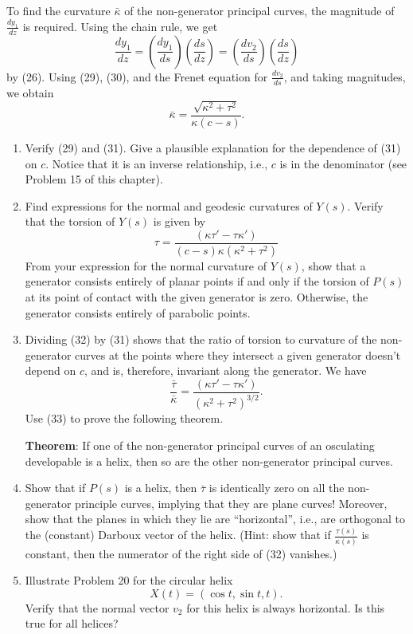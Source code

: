 \documentclass{book}
\begin{document}
To find the curvature $\bar{\kappa}$ of the non-generator principal curves, the magnitude of $\frac{dy_{1}}{dz}$ is required. Using the chain rule, we get
\begin{equation}
\frac{dy_{1}}{dz} = \left( \frac{dy_{1}}{ds} \right)  \left( \frac{ds}{dz} \right) = \left( \frac{dv_{2}}{ds} \right)  \left( \frac{ds}{dz} \right)
\end{equation}
by (26). Using (29), (30), and the Frenet equation for $\frac{dv_{2}}{ds}$, and taking magnitudes, we obtain
\begin{equation}
\bar{\kappa} = \frac{ \sqrt{\kappa ^{2} + \tau ^{2}} }{ \kappa (c - s) }.
\end{equation}

\begin{enumerate}
  \item[17.] Verify (29) and (31). Give a plausible explanation for the dependence of (31) on $c$. Notice that it is an inverse relationship, i.e., $c$ is in the denominator (see Problem 15 of this chapter).
  \item[18.] Find expressions for the normal and geodesic curvatures of $Y(s)$. Verify that the torsion of $Y(s)$ is given by
    \begin{equation}
      \tau = \frac{ (\kappa \tau ' - \tau \kappa ') }{ (c - s) \kappa (\kappa ^{2} + \tau ^{2}) }
    \end{equation}
    From your expression for the normal curvature of $Y(s)$, show that a generator consists entirely of planar points if and only if the torsion of $P(s)$ at its point of contact with the given generator is zero. Otherwise, the generator consists entirely of parabolic points.
  \item[19.] Dividing (32) by (31) shows that the ratio of torsion to curvature of the non-generator curves at the points where they intersect a given generator doesn't depend on $c$, and is, therefore, invariant along the generator. We have
    \begin{equation}
      \frac{\bar{\tau}}{\bar{\kappa}} = \frac{(\kappa \tau ' - \tau \kappa ')}{(\kappa ^{2} + \tau ^{2})^{3/2}}.
    \end{equation}
    Use (33) to prove the following theorem.

     \textbf{Theorem}: If one of the non-generator principal curves of an osculating developable is a helix, then so are the other non-generator principal curves.
  \item[20.] Show that if $P(s)$ is a helix, then $\bar{\tau}$ is identically zero on all the non-generator principle curves, implying that they are plane curves! Moreover, show that the planes in which they lie are ``horizontal'', i.e., are orthogonal to the (constant) Darboux vector of the helix. (Hint: show that if $\frac{\tau (s)}{\kappa (s)}$ is constant, then the numerator of the right side of (32) vanishes.)
  \item[21.] Illustrate Problem 20 for the circular helix
    \begin{equation*}
      X(t) = (\cos t, \sin t, t).
    \end{equation*}
    Verify that the normal vector $v_{2}$ for this helix is always horizontal. Is this true for all helices?
\end{enumerate}
\end{document}
